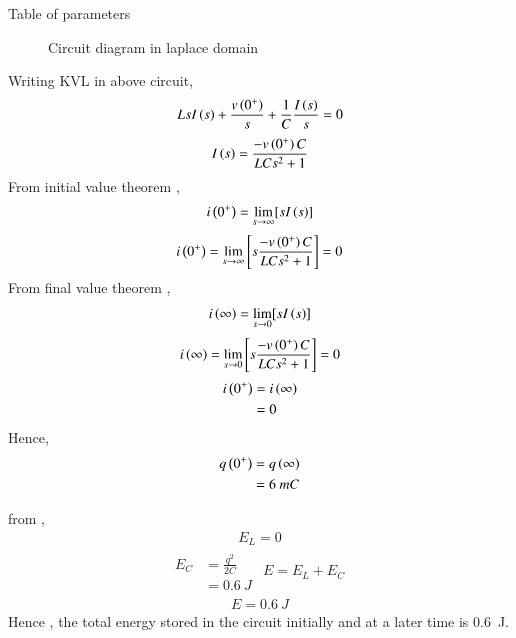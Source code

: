\documentclass[beamer]{IEEEtran}
\theoremstyle{remark}
\begin{document}
\begin{table}[h]
  \centering
  
  \caption{Table of parameters}
  \label{tab:12.7.8.1}
\end{table}
 \begin{figure}[h]


  
    

    



  
  
       
  
    \caption{Circuit diagram in laplace domain}
     
   \label{fig:12.7.8.2}
\end{figure}
Writing KVL in above circuit,
\begin{align}
    L{sI\left(s\right)}+\frac{v\left(0^{+}\right)}{s}+\frac{1}{C}\frac{I\left(s\right)}{s}=0
\end{align}
\begin{align}
    I\left(s\right)= \frac{-v\left(0^{+}\right)C}{LCs^2+1}
\end{align}
From initial value theorem ,
\begin{align}
    i\left(0^{+}\right)=\lim_{s\to\infty}[sI\left(s\right)]
\end{align}
\begin{align}
    i\left(0^{+}\right)=\lim_{s\to\infty}\left[s\frac{-v\left(0^{+}\right)C}{LCs^2+1}\right]=0
\end{align}
From final value theorem ,
\begin{align}
     i\left(\infty\right)=\lim_{s\to0}[sI\left(s\right)]
\end{align}
\begin{align}
   i\left(\infty\right)=\lim_{s\to0}\left[s\frac{-v\left(0^{+}\right)C}{LCs^2+1}\right]=0 
\end{align}
\begin{align}
	\label{1}
	i\left(0^{+}\right)&=i\left(\infty\right)\\
	&=0
\end{align}
Hence,
\begin{align}
	q\left(0^{+}\right)&=q\left(\infty\right)\\
	&=6\ mC
\end{align}

from \brak{\ref{1}},
\begin{align}
    E_L=0
\end{align}
\begin{gather}
\begin{align}
	E_C&=\frac{q^2}{2C}\\
       &=0.6\ J
\end{align}
\begin{align}
    E=E_L+E_C
\end{align}
\end{gather}
\begin{align}
    E=0.6\ J
\end{align}
Hence , the total energy stored in the circuit initially and at a later time is 0.6\ J.
\end{document}
